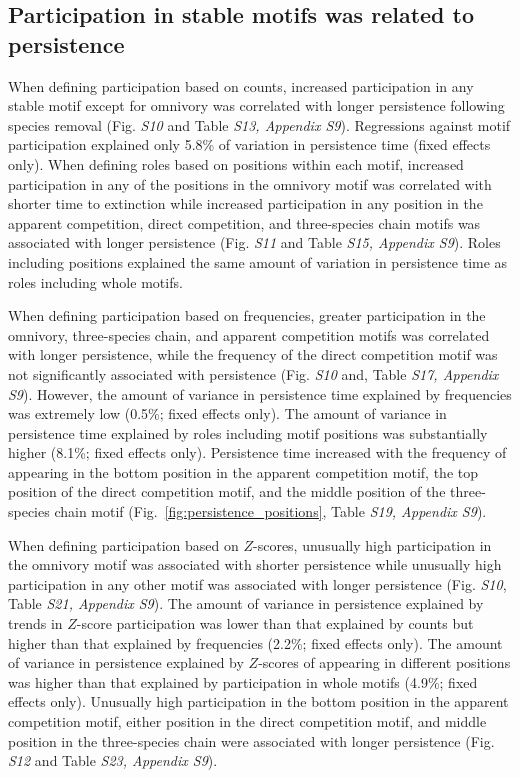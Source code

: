 \documentclass[12pt]{article}
\begin{document}
\begin{spacing}{2.0}
    \subsection*{Participation in stable motifs was related to persistence}
    
        When defining participation based on counts, increased participation in any stable motif except for omnivory was correlated with longer persistence following species removal (Fig. \emph{S10} and Table \emph{S13, Appendix S9}).
        Regressions against motif participation explained only 5.8\% of variation in persistence time (fixed effects only).
        When defining roles based on positions within each motif,  increased participation in any of the positions in the omnivory motif was correlated with shorter time to extinction while increased participation in any position in the apparent competition, direct competition, and three-species chain motifs was associated with longer persistence (Fig. \emph{S11} and  Table \emph{S15, Appendix S9}).
        Roles including positions explained the same amount of variation in persistence time as roles including whole motifs.
        
        
        When defining participation based on frequencies, greater participation in the omnivory, three-species chain, and apparent competition motifs was correlated with longer persistence, while the frequency of the direct competition motif was not significantly associated with persistence (Fig. \emph{S10} and, Table \emph{S17, Appendix S9}).
        However, the amount of variance in persistence time explained by frequencies was extremely low (0.5\%; fixed effects only). 
        The amount of variance in persistence time explained by roles including motif positions was substantially higher (8.1\%; fixed effects only).
        Persistence time increased with the frequency of appearing in the bottom position in the apparent competition motif, the top position of the direct competition motif, and the middle position of the three-species chain motif (Fig.~\ref{fig:persistence_positions}, Table \emph{S19, Appendix S9}).

        
        When defining participation based on $Z$-scores, unusually high participation in the omnivory motif was associated with shorter persistence while unusually high participation in any other motif was associated with longer persistence (Fig. \emph{S10}, Table \emph{S21, Appendix S9}).
        The amount of variance in persistence explained by trends in $Z$-score participation was lower than that explained by counts but higher than that explained by frequencies (2.2\%; fixed effects only).
        The amount of variance in persistence explained by $Z$-scores of appearing in different positions was higher than that explained by participation in whole motifs (4.9\%; fixed effects only).
        Unusually high participation in the bottom position in the apparent competition motif, either position in the direct competition motif, and middle position in the three-species chain were associated with longer persistence (Fig. \emph{S12} and Table \emph{S23, Appendix S9}).



\end{spacing}
\end{document}
